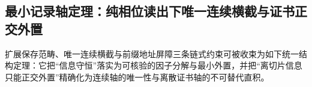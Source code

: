 





\subsection{最小记录轴定理：纯相位读出下唯一连续横截与证书正交外置}\label{subsec:cdim-minimal-record-axis}
扩展保存范畴、唯一连续横截与前缀地址屏障三条链式约束可被收束为如下统一结构定理：它把“信息守恒”落实为可核验的因子分解与最小外置，并把“离切片信息只能正交外置”精确化为连续轴的唯一性与离散证书轴的不可替代直积。

